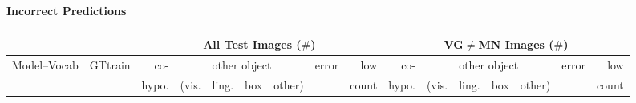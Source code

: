 \paragraph{Incorrect Predictions}

\begin{table}[t]
	\centering
	\small
	\begin{tabular}{ll|r@{~}|r@{~}r@{~}r@{~}r@{~}|r@{~}r@{~}||r@{~}|r@{~}r@{~}r@{~}r@{~}|r@{~}r@{~}}
		\toprule
		&& \multicolumn{7}{c}{All Test Images ($\#$)} 
		& \multicolumn{7}{c}{VG$\neq$MN Images ($\#$)}\\
		\toprule
		Model--Vocab & GTtrain  
		&  co- &  \multicolumn{4}{c}{other object}  &  error &  low 
		&  co- &  \multicolumn{4}{c}{other object}  &  error &  low \\
		& & hypo. & (vis. &  ling. &  box &  other)   & & count 
		&  hypo. & (vis. &  ling. &  box &  other) &   & count     \\
		

\end{tabular}
\end{table}
